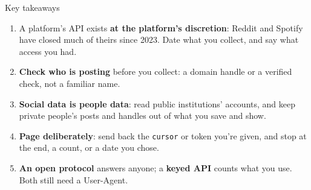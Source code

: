 \documentclass[9pt,aspectratio=169]{beamer}
\begin{document}
\begin{frame}{Key takeaways}
    \begin{enumerate}
        \item A platform's API exists \textbf{at the platform's discretion}: Reddit and Spotify have closed much of theirs since 2023. Date what you collect, and say what access you had.
        \item \textbf{Check who is posting} before you collect: a domain handle or a verified check, not a familiar name.
        \item \textbf{Social data is people data}: read public institutions' accounts, and keep private people's posts and handles out of what you save and show.
        \item \textbf{Page deliberately}: send back the \texttt{cursor} or token you're given, and stop at the end, a count, or a date you chose.
        \item \textbf{An open protocol} answers anyone; a \textbf{keyed API} counts what you use. Both still need a User-Agent.
    \end{enumerate}
\end{frame}
\end{document}
